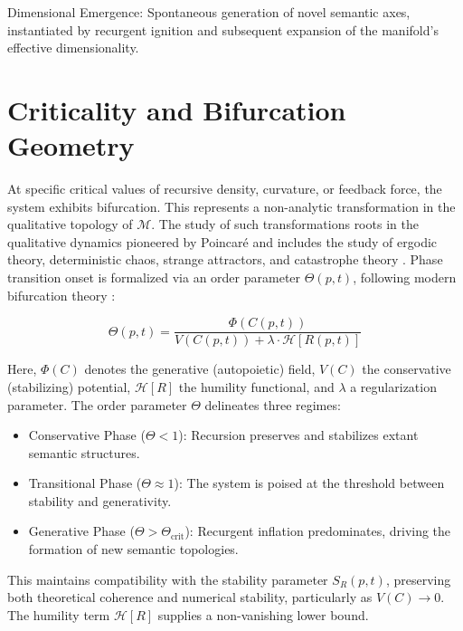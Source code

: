 Dimensional Emergence: Spontaneous generation of novel semantic axes, instantiated by recurgent ignition and subsequent expansion of the manifold's effective dimensionality.

\section{Criticality and Bifurcation Geometry}

At specific critical values of recursive density, curvature, or feedback force, the system exhibits bifurcation. This represents a non-analytic transformation in the qualitative topology of \(\mathcal{M}\). The study of such transformations roots in the qualitative dynamics pioneered by Poincaré and includes the study of ergodic theory, deterministic chaos, strange attractors, and catastrophe theory \autocite{Poincare1892, Birkhoff1931, Lorenz1963, Smale1967, RuelleTakens1971, Thom1975, Feigenbaum1978}. Phase transition onset is formalized via an order parameter \(\Theta(p,t)\), following modern bifurcation theory \autocite{GuckenheimerHolmes1983, Kuznetsov2004, Strogatz2014}:

\begin{equation}
\Theta(p,t) = \frac{\Phi(C(p,t))}{V(C(p,t)) + \lambda \cdot \mathcal{H}[R(p,t)]}
\end{equation}

Here, \(\Phi(C)\) denotes the generative (autopoietic) field, \(V(C)\) the conservative (stabilizing) potential, \(\mathcal{H}[R]\) the humility functional, and \(\lambda\) a regularization parameter. The order parameter \(\Theta\) delineates three regimes:

\begin{itemize}
    \item Conservative Phase (\(\Theta < 1\)): Recursion preserves and stabilizes extant semantic structures.
    \item Transitional Phase (\(\Theta \approx 1\)): The system is poised at the threshold between stability and generativity.
    \item Generative Phase (\(\Theta > \Theta_{\text{crit}}\)): Recurgent inflation predominates, driving the formation of new semantic topologies.
\end{itemize}

This maintains compatibility with the stability parameter \(S_R(p,t)\), preserving both theoretical coherence and numerical stability, particularly as \(V(C) \to 0\). The humility term \(\mathcal{H}[R]\) supplies a non-vanishing lower bound.

